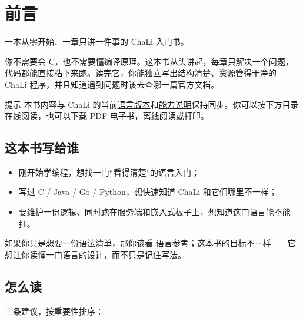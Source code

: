 \chapter*{前\hspace{1em}言}
\label{ch:preface}

一本从零开始、一章只讲一件事的 ChaLi 入门书。

你不需要会 C，也不需要懂编译原理。这本书从头讲起，每章只解决一个问题，代码都能直接粘下来跑。读完它，你能独立写出结构清楚、资源管得干净的 ChaLi 程序，并且知道遇到问题时该去查哪一篇官方文档。

\begin{tip}{提示}
本书内容与 ChaLi 的当前\href{https://gitee.com/rabbitc999/chali/tree/master/VERSION}{语言版本}和\href{https://gitee.com/rabbitc999/chali/blob/master/doc/17-capabilities.md}{能力说明}保持同步。你可以按下方目录在线阅读，也可以下载 \href{https://gitee.com/rabbitc999/chali/blob/master/doc/book/latex/book.pdf}{PDF 电子书}，离线阅读或打印。
\end{tip}

\section*{这本书写给谁}

\begin{itemize}

\item 刚开始学编程，想找一门“看得清楚”的语言入门；

\item 写过 C / Java / Go / Python，想快速知道 ChaLi 和它们哪里不一样；

\item 要维护一份逻辑、同时跑在服务端和嵌入式板子上，想知道这门语言能不能扛。

\end{itemize}

如果你只是想要一份语法清单，那你该看 \href{https://gitee.com/rabbitc999/chali/blob/master/doc/04-language-reference.md}{语言参考}；这本书的目标不一样——它想让你读懂一门语言的设计，而不只是记住写法。

\section*{怎么读}

三条建议，按重要性排序：

